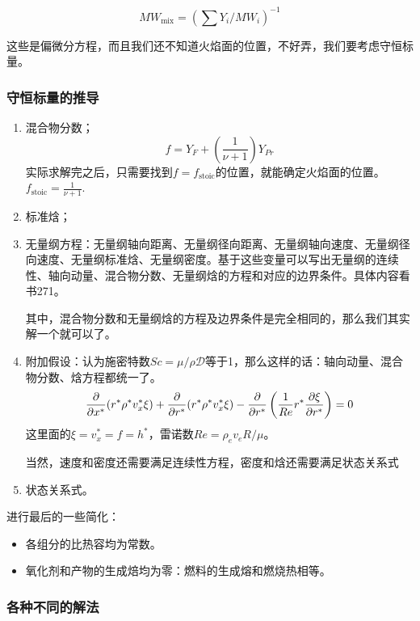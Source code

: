 \begin{equation}
    MW_\mathrm{mix} = \left(\sum Y_i / MW_i\right)^{-1}
\end{equation}

这些是偏微分方程，而且我们还不知道火焰面的位置，不好弄，我们要考虑守恒标量。

\subsubsection{守恒标量的推导}

\begin{enumerate}
    \item 混合物分数；
    \[
        f = Y_F + \left(\frac{1}{\nu + 1}\right)Y_{Pr}
    \]
    实际求解完之后，只需要找到\(f=f_\mathrm{stoic}\)的位置，就能确定火焰面的位置。\(f_\mathrm{stoic} = \frac{1}{\nu+1}\).
    \item 标准焓；
    \item 无量纲方程：无量纲轴向距离、无量纲径向距离、无量纲轴向速度、无量纲径向速度、无量纲标准焓、无量纲密度。基于这些变量可以写出无量纲的连续性、轴向动量、混合物分数、无量纲焓的方程和对应的边界条件。具体内容看书271。

    其中，混合物分数和无量纲焓的方程及边界条件是完全相同的，那么我们其实解一个就可以了。
    \item 附加假设：认为施密特数\(Sc=\mu/\rho \mathcal{D}\)等于1，那么这样的话：轴向动量、混合物分数、焓方程都统一了。
    {\tiny\begin{equation}
        \frac{\partial}{\partial x^*}(r^* \rho^* v_x^*\xi)+\frac{\partial}{\partial r^*}(r^* \rho^* v_x^*\xi) - \frac{\partial}{\partial r^*}\left(\frac{1}{Re}r^*\frac{\partial \xi}{\partial r^*}\right)=0
    \end{equation}}
    这里面的\(\xi = v_x^*=f=h^*\)，雷诺数\(Re=\rho_e v_e R/\mu\)。

    当然，速度和密度还需要满足连续性方程，密度和焓还需要满足状态关系式
    \item 状态关系式。
\end{enumerate}

进行最后的一些简化：
\begin{itemize}
    \item 各组分的比热容均为常数。
    \item 氧化剂和产物的生成焙均为零：燃料的生成熔和燃烧热相等。
\end{itemize}

\subsubsection{各种不同的解法}

